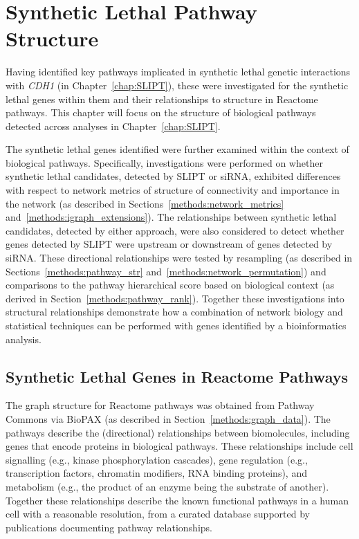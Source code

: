 \chapter{Synthetic Lethal Pathway Structure}
\label{chap:Pathways}
  
Having identified key pathways implicated in \gls{synthetic lethal} genetic interactions with \textit{CDH1} (in Chapter~\ref{chap:SLIPT}), these were investigated for the \gls{synthetic lethal} genes within them and their relationships to  structure in Reactome pathways. This chapter will focus on the  structure of biological pathways detected across analyses in Chapter~\ref{chap:SLIPT}. 

The \gls{synthetic lethal} genes identified were further examined within the context of biological pathways. Specifically, investigations were performed on whether \gls{synthetic lethal} candidates, detected by \gls{SLIPT} or \gls{siRNA}, exhibited differences with respect to network metrics of  structure of connectivity and importance in the network (as described in Sections~\ref{methods:network_metrics} and~\ref{methods:igraph_extensions}). The relationships between \gls{synthetic lethal} candidates, detected by either approach, were also considered to detect whether genes detected by \gls{SLIPT} were upstream or downstream of genes detected by \gls{siRNA}. These directional relationships were tested by resampling (as described in Sections~\ref{methods:pathway_str} and~\ref{methods:network_permutation}) and comparisons to the pathway hierarchical score based on biological context (as derived in Section~\ref{methods:pathway_rank}). 
%
Together these investigations into structural relationships demonstrate how a combination of network biology and statistical techniques can be performed with genes identified by a \gls{bioinformatics} analysis.

\FloatBarrier

\section{Synthetic Lethal Genes in Reactome Pathways} \label{chapt4:SL_Genes}

\FloatBarrier

The \gls{graph} structure for Reactome pathways was obtained from Pathway Commons via \gls{BioPAX} (as described in Section~\ref{methods:graph_data}). The pathways describe the (directional) relationships between biomolecules, including genes that encode proteins in biological pathways. These relationships include cell signalling (e.g., kinase phosphorylation cascades), gene regulation (e.g., transcription factors, chromatin modifiers, \acrshort{RNA} binding proteins), and metabolism (e.g., the product of an enzyme being the substrate of another). Together these relationships describe the known functional pathways in a human cell with a reasonable resolution, from a curated database supported by publications documenting pathway relationships. 

